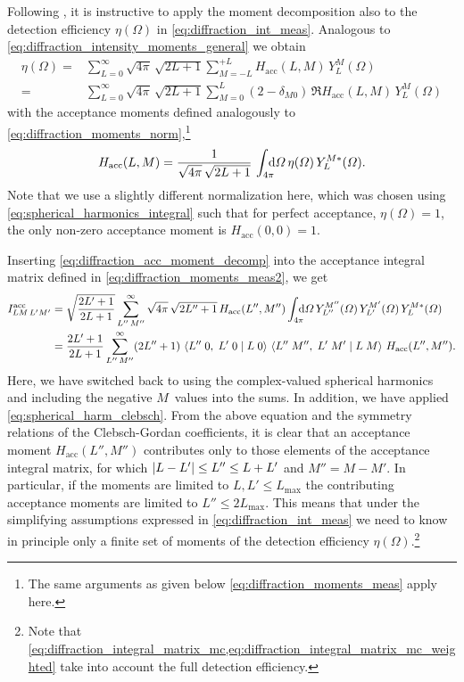 Following , it is instructive to apply the
moment decomposition also to the detection efficiency $\eta(\Omega)$
in \cref{eq:diffraction_int_meas}.  Analogous to
\cref{eq:diffraction_intensity_moments_general} we obtain
\begin{align}
  \label{eq:diffraction_acc_moment_decomp}
  \eta(\Omega)
  ={}& \sum_{L = 0}^\infty \sqrt{4 \pi}\, \sqrt{2 L + 1} \sum_{M = -L}^{+L} H_\text{acc}(L, M)\, Y_L^M(\Omega)
  \\
  ={}& \sum_{L = 0}^\infty \sqrt{4 \pi}\, \sqrt{2 L + 1} \sum_{M = 0}^{L} (2 - \delta_{M 0})\, \Re{H_\text{acc}(L, M)\, Y_L^M(\Omega)}
\end{align}
with the acceptance moments defined analogously to
\cref{eq:diffraction_moments_norm},\footnote{The same arguments as
given below \cref{eq:diffraction_moments_meas} apply here.} \ie
\begin{equation}
  \label{eq:diffraction_acc_moment}
  H_\text{acc}(L, M)
  = \frac{1}{\sqrt{4 \pi}\, \sqrt{2 L + 1}}\, \int_{4 \pi}\!\!\!\! \dif{\Omega}\, \eta(\Omega)\, Y_L^{M *}(\Omega).
\end{equation}
Note that we use a slightly different normalization here, which was
chosen using \cref{eq:spherical_harmonics_integral} such that for
perfect acceptance, \ie $\eta(\Omega) = 1$, the only non-zero
acceptance moment is $H_\text{acc}(0, 0) = 1$.%

Inserting \cref{eq:diffraction_acc_moment_decomp} into the acceptance
integral matrix defined in \cref{eq:diffraction_moments_meas2}, we get
\begin{align}
  I^\text{acc}_{L M\, L' M'}
  ={}& \sqrt{\frac{2 L' + 1}{2 L + 1}} \sum_{L''\, M''}^\infty \sqrt{4 \pi}\, \sqrt{2 L'' + 1}\, H_\text{acc}(L'', M'')
  \int_{4 \pi}\!\!\!\! \dif{\Omega}\, Y_{L''}^{M''}(\Omega)\, Y_{L'}^{M'}(\Omega)\, Y_L^{M *}(\Omega) \nonumber
  \\
  \label{eq:diffraction_acc_int_moment_decomp}
  ={}& \frac{2 L' + 1}{2 L + 1} \sum_{L''\, M''}^\infty (2 L'' + 1)\,
  \clebsch{L''}{0}{L'}{0}{L}{0}\, \clebsch{L''}{M''}{L'}{M'}{L}{M}\, H_\text{acc}(L'', M'').
\end{align}
Here, we have switched back to using the complex-valued spherical
harmonics and including the negative $M$~values into the sums.  In
addition, we have applied \cref{eq:spherical_harm_clebsch}.
From the above equation and the symmetry relations of the
Clebsch-Gordan coefficients, it is clear that an acceptance moment
$H_\text{acc}(L'', M'')$ contributes only to those elements of the
acceptance integral matrix, for which $\vert{L - L'}\vert \leq L'' \leq L +
L'$ and $M'' = M - M'$.  In particular, if the moments are limited to
$L, L' \leq L_\text{max}$ the contributing acceptance moments are
limited to $L'' \leq 2 L_\text{max}$.  This means that under the
simplifying assumptions expressed in \cref{eq:diffraction_int_meas} we
need to know in principle only a finite set of moments of the
detection efficiency $\eta(\Omega)$.\footnote{Note that
\cref{eq:diffraction_integral_matrix_mc,eq:diffraction_integral_matrix_mc_weighted}
take into account the full detection efficiency.}


